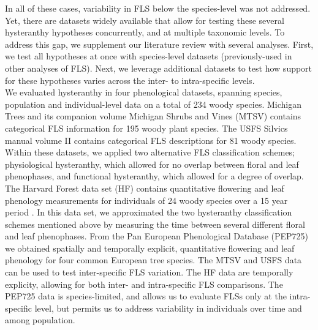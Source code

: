 \documentclass[12pt]{article}
\begin{document}
\indent In all of these cases, variability in FLS below the species-level was not addressed. Yet, there are datasets widely available that allow for testing these several hysteranthy hypotheses concurrently, and at multiple taxonomic levels. To address this gap, we supplement our literature review with several analyses. First, we test all hypotheses at once with species-level datasets (previously-used in other analyses of FLS). Next, we leverage additional datasets to test how support for these hypotheses varies across the inter- to intra-specific levels.\\ 

\indent We evaluated hysteranthy in four phenological datasets, spanning species, population and individual-level data on a total of 234 woody species. Michigan Trees and its companion volume Michigan Shrubs and Vines \citep{Barnes2004,Barnes2016} (MTSV) contains categorical FLS information for 195 woody plant species. The USFS Silvics manual volume II \citep{Burns1990} contains categorical FLS descriptions for 81 woody species. Within these datasets, we applied two alternative FLS classification schemes; physiological hysteranthy, which allowed for no overlap between floral and leaf phenophases, and functional hysteranthy, which allowed for a degree of overlap. The Harvard Forest data set (HF) contains quantitative flowering and leaf phenology measurements for individuals of 24 woody species over a 15 year period \citep{OKeefe2015}. In this data set, we approximated the two hysteranthy classification schemes mentioned above by measuring the time between several different floral and leaf phenophases. From the Pan European Phenological Database (PEP725) \citep{PEP725} we obtained spatially and temporally explicit, quantitative flowering and leaf phenology for four common European tree species. The MTSV and USFS data can be used to test inter-specific FLS variation. The HF data are temporally explicity, allowing for both inter- and intra-specific FLS comparisons. The PEP725 data is species-limited, and allows us to evaluate FLSs only at the intra-specific level, but permits us to address variability in individuals over time and among population.\\
\end{document}
